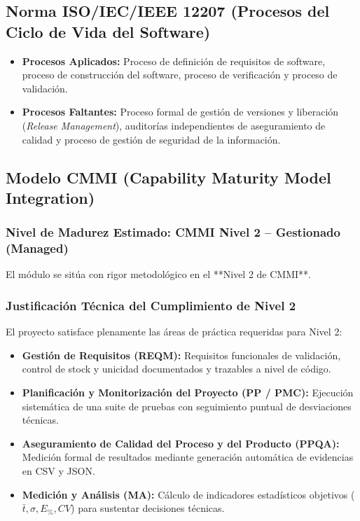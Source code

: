 \documentclass{article}
\begin{document}
\subsection{Norma ISO/IEC/IEEE 12207 (Procesos del Ciclo de Vida del Software)}
\begin{itemize}[leftmargin=*]
\item \textbf{Procesos Aplicados:} Proceso de definición de requisitos de software, proceso de construcción del software, proceso de verificación y proceso de validación.
\item \textbf{Procesos Faltantes:} Proceso formal de gestión de versiones y liberación (\textit{Release Management}), auditorías independientes de aseguramiento de calidad y proceso de gestión de seguridad de la información.
\end{itemize}

\subsection{Modelo CMMI (Capability Maturity Model Integration)}

\subsubsection{Nivel de Madurez Estimado: CMMI Nivel 2 -- Gestionado (Managed)}
El módulo se sitúa con rigor metodológico en el **Nivel 2 de CMMI**.

\subsubsection{Justificación Técnica del Cumplimiento de Nivel 2}
El proyecto satisface plenamente las áreas de práctica requeridas para Nivel 2:
\begin{itemize}[leftmargin=*]
\item \textbf{Gestión de Requisitos (REQM):} Requisitos funcionales de validación, control de stock y unicidad documentados y trazables a nivel de código.
\item \textbf{Planificación y Monitorización del Proyecto (PP / PMC):} Ejecución sistemática de una suite de pruebas con seguimiento puntual de desviaciones técnicas.
\item \textbf{Aseguramiento de Calidad del Proceso y del Producto (PPQA):} Medición formal de resultados mediante generación automática de evidencias en CSV y JSON.
\item \textbf{Medición y Análisis (MA):} Cálculo de indicadores estadísticos objetivos ($\bar{t}, \sigma, E_{\%}, CV$) para sustentar decisiones técnicas.
\end{itemize}
\end{document}
